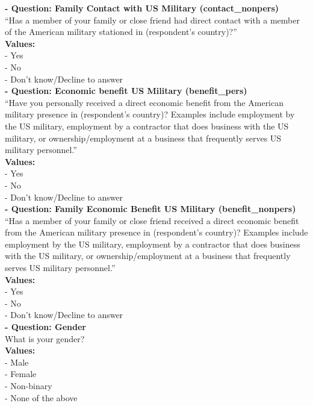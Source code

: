 \documentclass[12pt]{article}
\begin{document}
\noindent\textbf{  - Question: Family Contact with US Military  (contact\_nonpers)} \\
``Has a member of your family or close friend had direct contact with a member of the American military stationed in (respondent's country)?''\\
\textbf{Values:}\\
 - Yes\\
 - No\\
 - Don’t know/Decline to answer\\

\noindent\textbf{  - Question: Economic benefit US Military  (benefit\_pers)} \\
``Have you personally received a direct economic benefit from the American military presence in (respondent's country)? Examples include employment by the US military, employment by a contractor that does business with the US military, or ownership/employment at a business that frequently serves US military personnel.''\\
\textbf{Values:}\\
 - Yes\\
 - No\\
 - Don’t know/Decline to answer\\


\noindent\textbf{  - Question: Family Economic Benefit US Military  (benefit\_nonpers)} \\
``Has a member of your family or close friend received a direct economic benefit from the American military presence in (respondent's country)? Examples include employment by the US military, employment by a contractor that does business with the US military, or ownership/employment at a business that frequently serves US military personnel.''\\
\textbf{Values:}\\
 - Yes\\
 - No\\
 - Don’t know/Decline to answer\\


 \noindent\textbf{  - Question: Gender} \\
What is your gender?\\
\textbf{Values:}\\
 - Male \\
 - Female\\
 - Non-binary\\
 - None of the above\\
\end{document}
